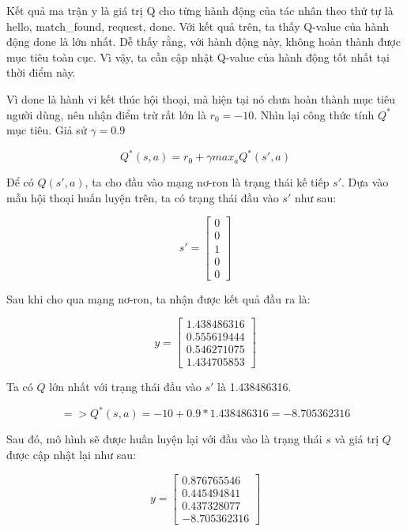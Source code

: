 Kết quả ma trận y là giá trị Q cho từng hành động của tác nhân theo thứ tự là hello, match\_found, request, done. Với kết quả trên, ta thấy Q-value của hành động done là lớn nhất. Dễ thấy rằng, với hành động này, không hoàn thành được mục tiêu toàn cục. Vì vậy, ta cần cập nhật Q-value của hành động tốt nhất tại thời điểm này.

Vì done là hành vi kết thúc hội thoại, mà hiện tại nó chưa hoàn thành mục tiêu người dùng, nên nhận điểm trừ rất lớn là $r_0 = -10$. Nhìn lại công thức tính $Q^*$ mục tiêu. Giả sử $\gamma = 0.9$

\begin{equation*}
    Q^*(s,a) = r_0 + {\gamma}max_{a}Q^{*}(s',a)
\end{equation*}

Để có $Q(s',a)$, ta cho đầu vào mạng nơ-ron là trạng thái kế tiếp $s'$. Dựa vào mẫu hội thoại huấn luyện trên, ta có trạng thái đầu vào $s'$ như sau:

\begin{equation*}
    s' = 
    \begin{bmatrix}
        0 \\
        0 \\
        1 \\
        0 \\
        0
    \end{bmatrix}
\end{equation*}

Sau khi cho qua mạng nơ-ron, ta nhận được kết quả đầu ra là:

\begin{equation*}
    y = 
    \begin{bmatrix}
        1.438486316 \\
        0.555619444 \\
        0.546271075 \\
        1.434705853
    \end{bmatrix}
\end{equation*}

Ta có $Q$ lớn nhất với trạng thái đầu vào $s'$ là 1.438486316.

\begin{equation*}
    => Q^*(s,a) = -10 + 0.9*1.438486316 = -8.705362316
\end{equation*}

Sau đó, mô hình sẽ được huấn luyện lại với đầu vào là trạng thái $s$ và giá trị $Q$ được cập nhật lại như sau:

\begin{equation*}
    y = 
    \begin{bmatrix}
        0.876765546 \\
        0.445494841 \\
        0.437328077 \\
        -8.705362316
    \end{bmatrix}
\end{equation*}

